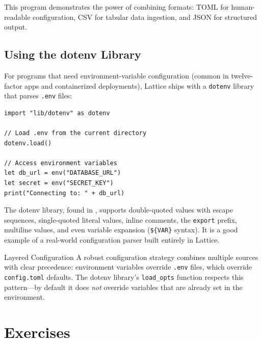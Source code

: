 This program demonstrates the power of combining formats: TOML for
human-readable configuration, CSV for tabular data ingestion, and JSON for
structured output.

\subsection{Using the dotenv Library}


For programs that need environment-variable configuration (common in
twelve-factor apps and containerized deployments), Lattice ships with a
\texttt{dotenv} library that parses \texttt{.env} files:

\begin{lstlisting}[language=Lattice, caption={Loading environment variables from a .env file}]
import "lib/dotenv" as dotenv

// Load .env from the current directory
dotenv.load()

// Access environment variables
let db_url = env("DATABASE_URL")
let secret = env("SECRET_KEY")
print("Connecting to: " + db_url)
\end{lstlisting}

The dotenv library, found in , supports
double-quoted values with escape sequences, single-quoted literal values,
inline comments, the \texttt{export} prefix, multiline values, and even
variable expansion (\texttt{\$\{VAR\}} syntax). It is a good example of a
real-world configuration parser built entirely in Lattice.

\begin{tipbox}{Layered Configuration}
A robust configuration strategy combines multiple sources with clear
precedence: environment variables override \texttt{.env} files, which
override \texttt{config.toml} defaults. The dotenv library's
\lstinline|load_opts| function respects this pattern---by default it does
\emph{not} override variables that are already set in the environment.
\end{tipbox}

\section*{Exercises}\label{sec:data-formats-exercises}

